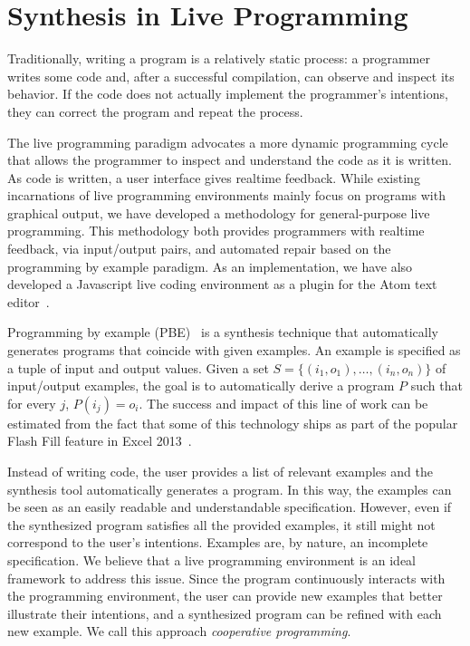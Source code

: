 \section{Synthesis in Live Programming}
\label{sec:intro}


Traditionally, writing a program is a relatively static process: a programmer writes some code and, after a successful compilation, can observe and inspect its behavior. If the code does not actually implement the programmer's intentions, they can correct the program and repeat the process.

The live programming paradigm advocates a more dynamic programming cycle that allows the programmer to inspect and understand the code as it is written. As code is written, a user interface gives realtime feedback.  While existing incarnations of live programming environments mainly focus on programs with graphical output, we have developed a methodology for general-purpose live programming.  
This methodology both provides programmers with realtime feedback, via input/output pairs, and automated repair based on the programming by example paradigm. 
As an implementation, we have also developed a Javascript live coding environment as a plugin for the Atom text editor~\cite{Atom}.

Programming by example (PBE)~\cite{cypher93,lieberman01,synasc12} is a synthesis technique that automatically generates programs that coincide with given examples. An example is specified as a tuple of input and output values. Given a set $S= \{(i_1, o_1),\ldots, (i_n, o_n)\}$ of input/output examples, the goal is to automatically derive a program $P$ such that for every $j$, $P(i_j) = o_i$. The success and impact of this line of work can be estimated from the fact that some of this technology ships as part of the popular Flash Fill feature in Excel 2013~\cite{flashFillPOPL}.

Instead of writing code, the user provides a list of relevant examples and the synthesis tool automatically generates a program. In this way, the examples can be seen as an easily readable and understandable specification. However, even if the synthesized program satisfies all the provided examples, it still might not correspond to the user's intentions. Examples are, by nature, an incomplete specification. We believe that a live programming environment is an ideal framework to address this issue. Since the program continuously interacts with the programming environment, the user can provide new examples that better illustrate their intentions, and a synthesized program can be refined with each new example. We call this approach {\emph{cooperative programming}}.

